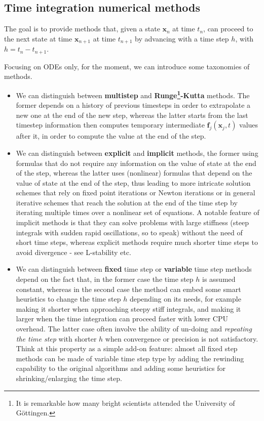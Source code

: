 \documentclass{digitaldynamics}
\def\vect#1{\bm{#1}}
\begin{document}
\subsection{Time integration numerical methods}

The goal is to provide methods that, given a state $\vect{x}_n$ at time $t_{n}$, can proceed to the next state at time $\vect{x}_{n+1}$ at time $t_{n+1}$ by advancing with a time step $h$, with $h=t_{n}-t_{n+1}$.

Focusing on ODEs only, for the moment, we can introduce some taxonomies of methods.

\begin{itemize}

\item
We can distinguish between \textbf{multistep} and \textbf{Runge\footnote{It is remarkable how many bright scientists attended the University of Göttingen.}-Kutta} methods.
The former depends on a history of previous timesteps in order to extrapolate a new one at the end of the new step, whereas the latter starts from the last timestep information then computes temporary intermediate $\vect{f}_j \left( \vect{x}_j, t\right)$ values after it, in order to compute the value at the end of the step.

\item
We can distinguish between \textbf{explicit} and \textbf{implicit} methods, the former using formulas that do not require any information on the value of state at the end of the step, whereas the latter uses (nonlinear) formulas that depend on the value of state at the end of the step, thus leading to more intricate solution schemes that rely on fixed point iterations or Newton iterations or in general iterative schemes that reach the solution at the end of the time step by iterating multiple times over a nonlinear set of equations. 
A notable feature of implicit methods is that they can solve problems with large stiffness (steep integrals with sudden rapid oscillations, so to speak) without the need of short time steps, whereas explicit methods require much shorter time steps to avoid divergence - see L-stability etc.

\item
We can distinguish between \textbf{fixed} time step or \textbf{variable} time step methods depend on the fact that, in the former case the time step $h$ is assumed constant, whereas in the second case the method can embed some smart heuristics to change the time step $h$ depending on its needs, for example making it shorter when approaching steepy stiff integrals, and making it larger when the time integration can proceed faster with lower CPU overhead. The latter case often involve the ability of un-doing and \textit{repeating the time step} with shorter $h$ when convergence or precision is not satisfactory. 
Think at this property as a simple add-on feature: almost all fixed step methods can be made of variable time step type by adding the rewinding capability to the original algorithms and adding some heuristics for shrinking/enlarging the time step.


\end{itemize}
\end{document}
